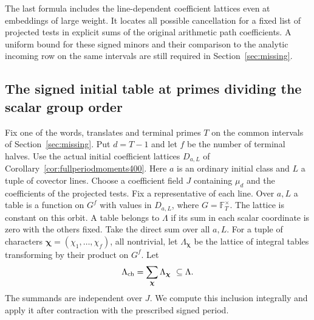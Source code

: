 \documentclass[a4paper,11pt]{article}
\theoremstyle{definition}
\theoremstyle{remark}
\numberwithin{equation}{section}
\begin{document}
The last formula includes the line-dependent coefficient lattices
even at embeddings of large weight. It locates all possible
cancellation for a fixed list of projected tests in explicit
sums of the original arithmetic path coefficients. A uniform
bound for these signed minors and their comparison to the analytic
incoming row on the same intervals are still required in
Section~\ref{sec:missing}.


\subsection{The signed initial table at primes dividing the scalar group order}
\label{sec:signedscalarcharacters432}

Fix one of the words, translates and terminal primes \(T\) on
the common intervals of Section~\ref{sec:missing}. Put \(d=T-1\)
and let \(f\) be the number of terminal halves. Use the actual
initial coefficient lattices \(D_{a,L}\) of
Corollary~\ref{cor:fullperiodmoments400}. Here \(a\) is an
ordinary initial class and \(L\) a tuple of covector lines.
Choose a coefficient field \(J\) containing \(\mu_d\) and the
coefficients of the projected tests. Fix a representative of each
line. Over \(a,L\) a table is a function on \(G^f\) with values in
\(D_{a,L}\), where \(G=\mathbb F_T^\times\). The lattice is
constant on this orbit. A table belongs to \(\Lambda\) if its sum
in each scalar coordinate is zero with the others fixed. Take the
direct sum over all \(a,L\). For a tuple of characters
\(\boldsymbol\chi=(\chi_1,\ldots,\chi_f)\), all nontrivial, let
\(\Lambda_{\boldsymbol\chi}\) be the lattice of integral tables
transforming by their product on \(G^f\). Let
\[
        \Lambda_{\rm ch}=\sum_{\boldsymbol\chi}
                          \Lambda_{\boldsymbol\chi}\ \subseteq\Lambda .
\]
The summands are independent over \(J\). We compute this
inclusion integrally and apply it after contraction with the
prescribed signed period.
\end{document}
